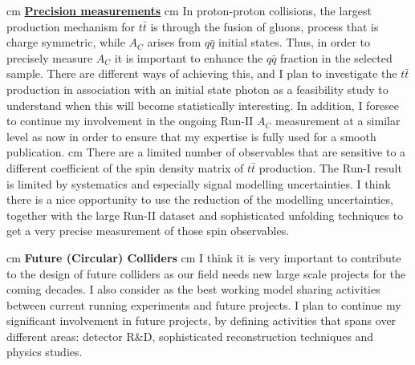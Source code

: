 \documentclass[12pt]{article}
\begin{document}
 cm
\noindent
\underline{\bf Precision measurements}
 cm
\noindent
In proton-proton collisions, the largest production mechanism for $t\bar{t}$ is through the fusion of gluons, process that is charge symmetric, while $A_C$ arises from $q\bar{q}$ initial states. Thus, in order to precisely measure $A_C$ it is important to enhance the $q\bar{q}$ fraction in the selected sample. There are different ways of achieving this, and I plan to investigate the $t\bar{t}$ production in association with an initial state photon as a feasibility study to understand when this will become statistically interesting. In addition, I foresee to continue my involvement in the ongoing Run-II $A_C$ measurement at a similar level as now in order to ensure that my expertise is fully used for a smooth publication.
 cm
\noindent
There are a limited number of observables that are sensitive to a different coefficient of the spin density matrix of $t\bar{t}$ production. The Run-I result is limited by systematics and especially signal modelling uncertainties. I think there is a nice opportunity to use the reduction of the modelling uncertainties, together with the large Run-II dataset and sophisticated unfolding techniques to get a very precise measurement of those spin observables.






 cm
\noindent
{\bf \Large Future (Circular) Colliders}
 cm
\noindent
I think it is very important to contribute to the design of future colliders as our field needs new large scale projects for the coming decades. I also consider as the best working model sharing activities between current running experiments and future projects. I plan to continue my significant involvement in future projects, by defining activities that spans over different areas: detector R\&D, sophisticated reconstruction techniques and physics studies.
\end{document}
